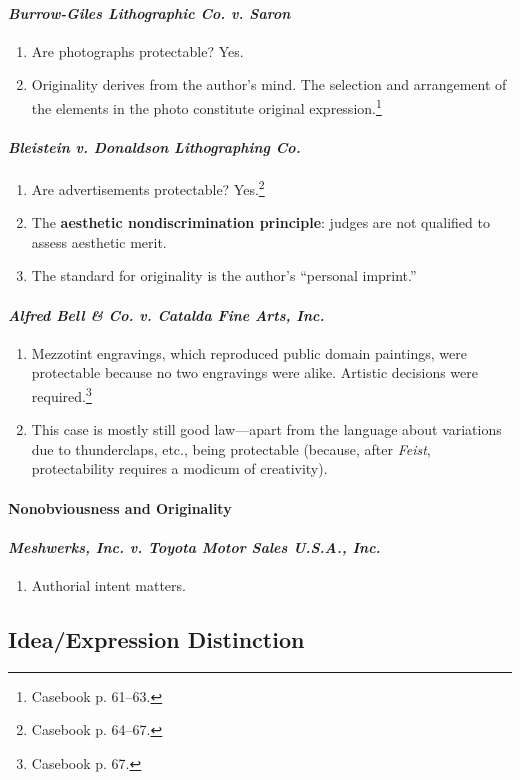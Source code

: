 \paragraph{\emph{Burrow-Giles Lithographic Co. v. Saron}}

\begin{enumerate}
    \item Are photographs protectable? Yes.
    \item Originality derives from the author's mind. The selection and 
    arrangement of the elements in the photo constitute original 
    expression.\footnote{Casebook p. 61--63.}
\end{enumerate}

\paragraph{\emph{Bleistein v. Donaldson Lithographing Co.}}

\begin{enumerate}
    \item Are advertisements protectable? Yes.\footnote{Casebook p. 64--67.}
    \item The \textbf{aesthetic nondiscrimination principle}: judges are not 
    qualified to assess aesthetic merit.
    \item The standard for originality is the author's ``personal imprint.''
\end{enumerate}

\paragraph{\emph{Alfred Bell \& Co. v. Catalda Fine Arts, Inc.}}

\begin{enumerate}
    \item Mezzotint engravings, which reproduced public domain paintings, were 
    protectable because no two engravings were alike. Artistic decisions were 
    required.\footnote{Casebook p. 67.}
    \item This case is mostly still good law---apart from the language about 
    variations due to thunderclaps, etc., being protectable (because, after 
    \emph{Feist}, protectability requires a modicum of creativity).
\end{enumerate}

\paragraph{Nonobviousness and Originality}


\paragraph{\emph{Meshwerks, Inc. v. Toyota Motor Sales U.S.A., Inc.}}

\begin{enumerate}
    \item Authorial intent matters.
\end{enumerate}

\subsection{Idea/Expression Distinction}

